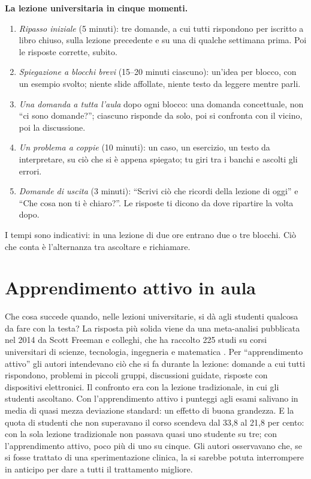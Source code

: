 \begin{inpratica}
\textbf{La lezione universitaria in cinque momenti.}
\begin{enumerate}
  \item \emph{Ripasso iniziale} (5 minuti): tre domande, a cui tutti
        rispondono per iscritto a libro chiuso, sulla lezione
        precedente e su una di qualche settimana prima. Poi le
        risposte corrette, subito.
  \item \emph{Spiegazione a blocchi brevi} (15--20 minuti ciascuno):
        un'idea per blocco, con un esempio svolto; niente slide
        affollate, niente testo da leggere mentre parli.
  \item \emph{Una domanda a tutta l'aula} dopo ogni blocco: una
        domanda concettuale, non \enquote{ci sono domande?}; ciascuno
        risponde da solo, poi si confronta con il vicino, poi la
        discussione.
  \item \emph{Un problema a coppie} (10 minuti): un caso, un
        esercizio, un testo da interpretare, su ciò che si è appena
        spiegato; tu giri tra i banchi e ascolti gli errori.
  \item \emph{Domande di uscita} (3 minuti): \enquote{Scrivi ciò che
        ricordi della lezione di oggi} e \enquote{Che cosa non ti è
        chiaro?}. Le risposte ti dicono da dove ripartire la volta
        dopo.
\end{enumerate}
I tempi sono indicativi: in una lezione di due ore entrano due o tre
blocchi. Ciò che conta è l'alternanza tra ascoltare e richiamare.
\end{inpratica}

\section{Apprendimento attivo in aula}

Che cosa succede quando, nelle lezioni universitarie, si dà agli
studenti qualcosa da fare con la testa? La risposta più solida viene
da una meta-analisi pubblicata nel 2014 da Scott Freeman e colleghi,
che ha raccolto 225 studi su corsi universitari di scienze,
tecnologia, ingegneria e matematica \parencite{freeman2014}. Per
\enquote{apprendimento attivo} gli autori intendevano ciò che si fa
durante la lezione: domande a cui tutti rispondono, problemi in
piccoli gruppi, discussioni guidate, risposte con dispositivi
elettronici. Il confronto era con la lezione tradizionale, in cui gli
studenti ascoltano. Con l'apprendimento attivo i punteggi agli esami
salivano in media di quasi mezza deviazione standard: un effetto di
buona grandezza. E la quota di studenti che non superavano il corso
scendeva dal 33,8 al 21,8 per cento: con la sola lezione tradizionale
non passava quasi uno studente su tre; con l'apprendimento attivo,
poco più di uno su cinque. Gli autori osservavano che, se si fosse
trattato di una sperimentazione clinica, la si sarebbe potuta
interrompere in anticipo per dare a tutti il trattamento migliore.

